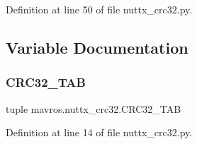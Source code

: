Definition at line 50 of file nuttx\+\_\+crc32.\+py.



\subsection{Variable Documentation}
\mbox{\label{namespacemavros_1_1nuttx__crc32_a3a0d08f2f707f86fdd0fc6e0a880e717}} 
\subsubsection{\texorpdfstring{CRC32\_TAB}{CRC32\_TAB}}
{\footnotesize\ttfamily tuple mavros.\+nuttx\+\_\+crc32.\+C\+R\+C32\+\_\+\+T\+AB}



Definition at line 14 of file nuttx\+\_\+crc32.\+py.


